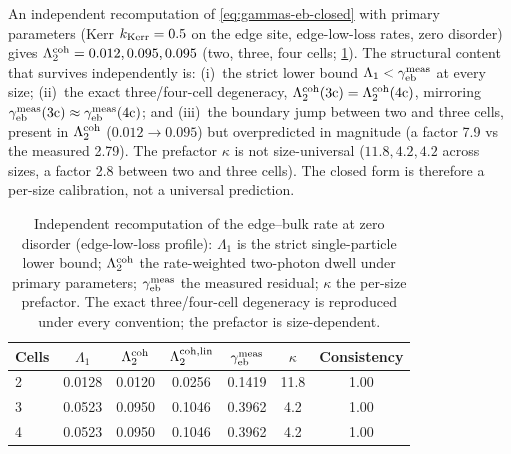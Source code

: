 \documentclass[aps,pra,preprint,superscriptaddress,amsmath,amssymb]{revtex4-2}
\begin{document}
An independent recomputation of \eqref{eq:gammas-eb-closed} with primary parameters (Kerr $k_{\rm Kerr}=\num{0.5}$ on the edge site, edge-low-loss rates, zero disorder) gives $\Lambda_2^{\rm coh}=\num{0.012},\num{0.095},\num{0.095}$ (two, three, four cells; \cref{tab:closedform-kappa}). The structural content that survives independently is: (i)~the strict lower bound $\Lambda_1<\gamma_{\rm eb}^{\rm meas}$ at every size; (ii)~the exact three/four-cell degeneracy, $\Lambda_2^{\rm coh}(3\mathrm{c})=\Lambda_2^{\rm coh}(4\mathrm{c})$, mirroring $\gamma_{\rm eb}^{\rm meas}(3\mathrm{c})\approx\gamma_{\rm eb}^{\rm meas}(4\mathrm{c})$; and (iii)~the boundary jump between two and three cells, present in $\Lambda_2^{\rm coh}$ ($\num{0.012}\to\num{0.095}$) but overpredicted in magnitude (a factor \num{7.9} vs the measured \num{2.79}). The prefactor $\kappa$ is not size-universal ($\num{11.8},\num{4.2},\num{4.2}$ across sizes, a factor \num{2.8} between two and three cells). The closed form is therefore a per-size calibration, not a universal prediction.

\begin{table}[t]
\caption{Independent recomputation of the edge--bulk rate at zero disorder (edge-low-loss profile): $\Lambda_1$ is the strict single-particle lower bound; $\Lambda_2^{\rm coh}$ the rate-weighted two-photon dwell under primary parameters; $\gamma_{\rm eb}^{\rm meas}$ the measured residual; $\kappa$ the per-size prefactor. The exact three/four-cell degeneracy is reproduced under every convention; the prefactor is size-dependent.}
\label{tab:closedform-kappa}
\begin{tabular}{lcccccc}
\hline
Cells & $\Lambda_1$ & $\Lambda_2^{\rm coh}$ & $\Lambda_2^{\rm coh,lin}$ & $\gamma_{\rm eb}^{\rm meas}$ & $\kappa$ & Consistency \\
\hline
\num{2} & \num{0.0128} & \num{0.0120} & \num{0.0256} & \num{0.1419} & \num{11.8} & \num{1.00} \\
\num{3} & \num{0.0523} & \num{0.0950} & \num{0.1046} & \num{0.3962} & \num{4.2} & \num{1.00} \\
\num{4} & \num{0.0523} & \num{0.0950} & \num{0.1046} & \num{0.3962} & \num{4.2} & \num{1.00} \\
\hline
\end{tabular}
\end{table}
\end{document}
